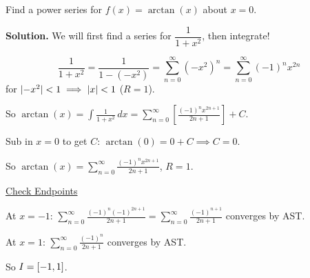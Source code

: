 \begin{Example}{}{}
    Find a power series for $ f(x)=\arctan(x) $ about $ x=0 $.

    \textbf{Solution.} We will first find a series for $ \dfrac{1}{1+x^2} $,
    then integrate!

    \[ \frac{1}{1+x^2} =\frac{1}{1-(-x^2)} =
        \sum\limits_{n=0}^{\infty} (-x^2)^n
        =\sum\limits_{n=0}^{\infty} (-1)^n x^{2n} \]
    for $ \lvert-x^2\rvert<1\implies \lvert x\rvert<1 $ ($ R=1 $).

    So $ \displaystyle\arctan(x)=\int \frac{1}{1+x^2} \, d{x} =
        \sum\limits_{n=0}^{\infty} \left[ \frac{(-1)^n x^{2n+1}}{2n+1}  \right] +C $.

    Sub in $ x=0 $ to get $ C $: $ \arctan(0)=0+C\implies C=0 $.

    So $ \displaystyle \arctan(x)=\sum\limits_{n=0}^{\infty} \frac{(-1)^n x^{2n+1}}{2n+1}  $,
    $ R=1 $.

    \underline{Check Endpoints}

    At $ x=-1 $: $ \displaystyle \sum\limits_{n=0}^{\infty} \frac{(-1)^n(-1)^{2n+1}}{2n+1}
        =\sum\limits_{n=0}^{\infty} \frac{(-1)^{n+1}}{2n+1}  $ converges by AST\@.

    At $ x=1 $: $ \displaystyle \sum\limits_{n=0}^{\infty} \frac{(-1)^n}{2n+1}  $
    converges by AST\@.

    So $ I=\interval{-1}{1} $.
\end{Example}

